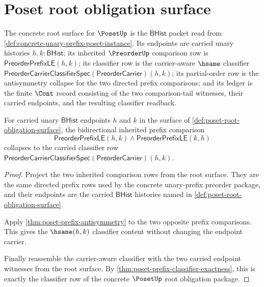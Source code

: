\section{Poset root obligation surface}
\label{sec:poset-root-obligation-surface}

\begin{definition}\label{def:poset-root-obligation-surface}
The concrete root surface for $\PosetUp$ is the $\mathsf{BHist}$ packet read
from \autoref{def:concrete-unary-prefix-poset-instance}. Its endpoints are
carried unary histories $h,k:\mathsf{BHist}$; its inherited $\PreorderUp$
comparison row is $\mathsf{PreorderPrefixLE}(h,k)$; its classifier row is the
carrier-aware $\hsame$ classifier
$\mathsf{PreorderCarrierClassifierSpec}(\mathsf{PreorderCarrier})(h,k)$; its
partial-order row is the antisymmetry collapse for the two directed prefix
comparisons; and its ledger is the finite $\Cont$ record consisting of the
two comparison-tail witnesses, their carried endpoints, and the resulting
classifier readback.
\end{definition}

\begin{theorem}\label{thm:poset-root-antisymmetry-obligation}
For carried unary $\mathsf{BHist}$ endpoints $h$ and $k$ in the surface of
\autoref{def:poset-root-obligation-surface}, the bidirectional inherited
prefix comparison
$$
\mathsf{PreorderPrefixLE}(h,k)\wedge
\mathsf{PreorderPrefixLE}(k,h)
$$
collapses to the carried classifier row
$\mathsf{PreorderCarrierClassifierSpec}(\mathsf{PreorderCarrier})(h,k)$.
\end{theorem}
\begin{proof}
Project the two inherited comparison rows from the root surface. They are the
same directed prefix rows used by the concrete unary-prefix preorder package,
and their endpoints are the carried $\mathsf{BHist}$ histories named in
\autoref{def:poset-root-obligation-surface}.

Apply \autoref{thm:poset-prefix-antisymmetry} to the two opposite prefix
comparisons. This gives the $\hsame(h,k)$ classifier content without changing
the endpoint carrier.

Finally reassemble the carrier-aware classifier with the two carried endpoint
witnesses from the root surface. By
\autoref{thm:poset-prefix-classifier-exactness}, this is exactly the
classifier row of the concrete $\PosetUp$ root obligation package.
\end{proof}

